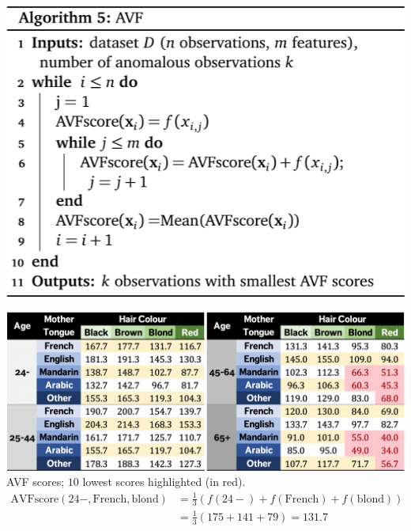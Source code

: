 \documentclass[20pt,landscape,footrule,headrule]{foils}
\begin{document}
{{\begin{center}\includegraphics[height=\textheight]{Images/Algorithm5}
\end{center}
\newpage
\begin{center}\includegraphics[width=\textwidth]{Images/AVFScores} \\ AVF scores; $10$ lowest scores highlighted (in red). \begin{align*}\text{AVFscore}(24-,\text{French},\text{blond})&=\textstyle{\frac{1}{3}(f(24-)+f(\text{French})+f(\text{blond}))} \\ 
&=\textstyle{\frac{1}{3}(175+141+79)=131.7}\end{align*} 
\end{center}

}}
\end{document}
